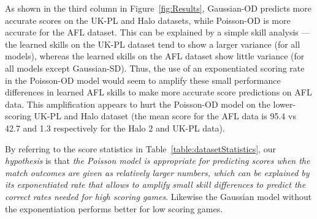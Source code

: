 \documentclass[runningheads,a4paper]{llncs}
\begin{document}

As shown in the third column in Figure~\ref{fig:Results}, Gaussian-OD
predicts more accurate scores on the UK-PL and Halo datasets, while
Poisson-OD is more accurate for the AFL dataset. This can be explained
by a simple skill analysis --- the learned skills on the UK-PL dataset
tend to show a larger variance (for all models), whereas the learned
skills on the AFL dataset show little variance (for all models except
Gaussian-SD). Thus, the use of an exponentiated scoring rate in the
Poisson-OD model would seem to amplify these small performance
differences in learned AFL skills to make more accurate score
predictions on AFL data.  This amplification appears to hurt the
Poisson-OD model on the lower-scoring UK-PL and Halo dataset (the mean
score for the AFL data is 95.4 vs 42.7 and 1.3 respectively for the
Halo 2 and UK-PL data).


\COMMENT
By referring to the score
statistics in Table~\ref{table:datasetStatistics}, our {\it
hypothesis} is that {\it the Poisson model is appropriate for
predicting scores when the match outcomes are given as relatively
larger numbers, which can be explained by its exponentiated rate that
allows to amplify small skill differences to predict the correct rates
needed for high scoring games}. Likewise the Gaussian model without
the exponentiation performs better for low scoring games.
\end{document}
